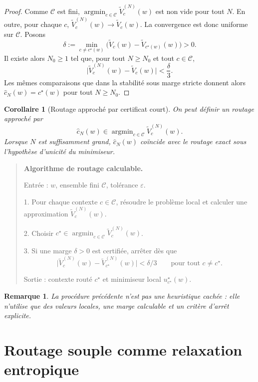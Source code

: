 \documentclass[11pt,a4paper]{article}
\newtheorem{corollary}{Corollaire}[section]
\newtheorem{remark}{Remarque}[section]
\DeclareMathOperator{\argmin}{argmin}
\newcommand{\Ccal}{\mathcal C}
\begin{document}
\begin{proof}
Comme \(\Ccal\) est fini, \(\argmin_{c\in\Ccal}\widetilde V_c^{(N)}(w)\) est non vide pour tout \(N\). En outre, pour chaque \(c\), \(\widetilde V_c^{(N)}(w)\to \widetilde V_c(w)\). La convergence est donc uniforme sur \(\Ccal\). Posons
\[
\delta:=\min_{c\neq c^\star(w)}\bigl(\widetilde V_c(w)-\widetilde V_{c^\star(w)}(w)\bigr)>0.
\]
Il existe alors \(N_0\ge 1\) tel que, pour tout \(N\ge N_0\) et tout \(c\in\Ccal\),
\[
\bigl|\widetilde V_c^{(N)}(w)-\widetilde V_c(w)\bigr|<\frac{\delta}{3}.
\]
Les mêmes comparaisons que dans la stabilité sous marge stricte donnent alors \(\hat c_N(w)=c^\star(w)\) pour tout \(N\ge N_0\).
\end{proof}

\begin{corollary}[Routage approché par certificat court]
On peut définir un routage approché par
\[
\hat c_N(w)\in\argmin_{c\in\Ccal}\widetilde V_c^{(N)}(w).
\]
Lorsque \(N\) est suffisamment grand, \(\hat c_N(w)\) coïncide avec le routage exact sous l'hypothèse d'unicité du minimiseur.
\end{corollary}

\begin{quote}
\small
\textbf{Algorithme de routage calculable.}

Entrée : \(w\), ensemble fini \(\Ccal\), tolérance \(\varepsilon\).

1. Pour chaque contexte \(c\in\Ccal\), résoudre le problème local et calculer une approximation \(\widetilde V_c^{(N)}(w)\).

2. Choisir \(c^\star\in\argmin_{c\in\Ccal}\widetilde V_c^{(N)}(w)\).

3. Si une marge \(\delta>0\) est certifiée, arrêter dès que
\[
\bigl|\widetilde V_c^{(N)}(w)-\widetilde V_{c^\star}^{(N)}(w)\bigr|<\delta/3
\qquad\text{pour tout }c\neq c^\star.
\]

Sortie : contexte routé \(c^\star\) et minimiseur local \(u_{c^\star}^\star(w)\).
\end{quote}

\begin{remark}
La procédure précédente n'est pas une heuristique cachée : elle n'utilise que des valeurs locales, une marge calculable et un critère d'arrêt explicite.
\end{remark}

\section{Routage souple comme relaxation entropique}
\end{document}
